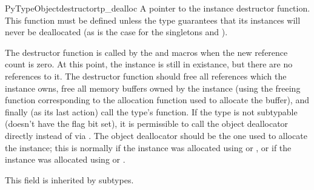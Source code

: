 \begin{cmemberdesc}{PyTypeObject}{destructor}{tp_dealloc}
  A pointer to the instance destructor function.  This function must
  be defined unless the type guarantees that its instances will never
  be deallocated (as is the case for the singletons  and
  ).

  The destructor function is called by the  and
   macros when the new reference count is
  zero.  At this point, the instance is still in existance, but there
  are no references to it.  The destructor function should free all
  references which the instance owns, free all memory buffers owned by
  the instance (using the freeing function corresponding to the
  allocation function used to allocate the buffer), and finally (as
  its last action) call the type's  function.  If the
  type is not subtypable (doesn't have the
   flag bit set), it is permissible to
  call the object deallocator directly instead of via
  .  The object deallocator should be the one used to
  allocate the instance; this is normally 
  if the instance was allocated using  or
  , or  if
  the instance was allocated using  or
  .

  This field is inherited by subtypes.
\end{cmemberdesc}


